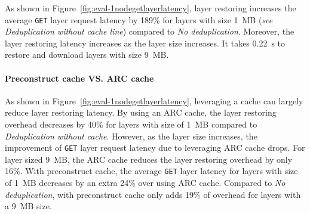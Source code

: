 As shown in Figure~\ref{fig:eval-1nodegetlayerlatency}, 
layer restoring increases the average \texttt{GET} layer request latency by 189\% for layers 
with size 1~MB (\emph{see Deduplication without cache line}) compared to \emph{No deduplication}.
Moreover, the layer restoring latency increases as the layer size increases.
It takes 0.22~s to restore and download layers with size 9~MB.

\paragraph{Preconstruct cache VS. ARC cache}
As shown in Figure~\ref{fig:eval-1nodegetlayerlatency}, 
leveraging a cache can largely reduce layer restoring latency.
By using an ARC cache, 
the layer restoring overhead decreases by 40\% for layers with size of 1~MB compared to \emph{Deduplication without cache}.
However, as the layer size increases, 
the improvement of \texttt{GET} layer request latency due to leveraging ARC cache drops.
For layer sized 9~MB, the ARC cache reduces the layer restoring overhead by only 16\%. 
With \sysname preconstruct cache, 
the average \texttt{GET} layer latency for layers 
with size of 1~MB decreases by an extra 24\% over using ARC cache.
Compared to \emph{No deduplication}, 
\sysname with preconstruct cache only adds 19\% of overhead for layers with a 9~MB size. 

